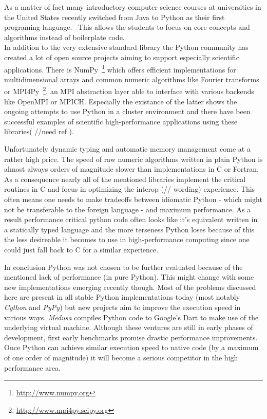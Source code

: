 As a matter of fact many introductory computer science courses at universities in the United States recently switched from Java to Python as their first programing language.~\cite{GUO14, intro_py} This allows the students to focus on core concepts and algorithms instead of boilerplate code.
\\


In addition to the very extensive standard library the Python community has created a lot of open source projects aiming to support especially scientific applications. There is NumPy~\footnote{\url{http://www.numpy.org}} which offers efficient implementations for multidimensional arrays and common numeric algorithms like Fourier transforms or MPI4Py~\footnote{\url{http://www.mpi4py.scipy.org}}, an MPI abstraction layer able to interface with various backends like OpenMPI or MPICH. Especially the existance of the latter shows the ongoing attempts to use Python in a cluster environment and there have been successful examples of scientific high-performance applications using these libraries( //need ref ).

Unfortunately dynamic typing and automatic memory management come at a rather high price. The speed of raw numeric algorithms written in plain Python is almost always orders of magnitude slower than implementations in C or Fortran. As a consequence nearly all of the mentioned libraries implement the critical routines in C and focus in optimizing the interop (// wording) experience. This often means one needs to make tradeoffs between idiomatic Python - which might not be transferable to the foreign language - and maximum performance. As a result performance critical python code often looks like it's equivalent written in a statically typed language and the more terseness Python loses because of this the less desireable it becomes to use in high-performance computing since one could just fall back to C for a similar experience.

In conclusion Python was not chosen to be further evaluated because of the mentioned lack of performance (in pure Python). This might change with some new implementations emerging recently though. Most of the problems discussed here are present in all stable Python implementations today (most notably \textit{Cython} and \textit{PyPy}) but new projects aim to improve the execution speed in various ways. \textit{Medusa} compiles Python code to Google's Dart to make use of the underlying virtual machine. Although these ventures are still in early phases of development, first early benchmarks promise drastic performance improvements. Once Python can achieve similar execution speed to native code (by a maximum of one order of magnitude) it will become a serious competitor in the high performance area.

